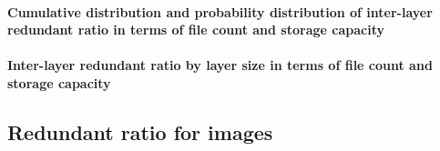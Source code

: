 \paragraph{Cumulative distribution and probability distribution of inter-layer redundant ratio in terms of file count and storage capacity}


\paragraph{Inter-layer redundant ratio by layer size in terms of file count and storage capacity}

\subsection{Redundant ratio for images}

